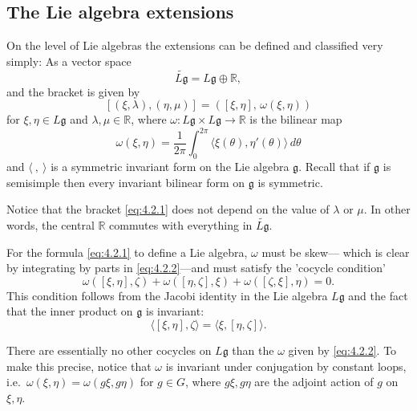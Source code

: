 \documentclass[12pt]{article}
\begin{document}
\subsection{The Lie algebra extensions}

On the level of Lie algebras the extensions can be defined and classified
very simply:  As a vector space
\[
    \widetilde{L\mathfrak{g}} = L\mathfrak{g} \oplus \mathbb{R},
\]
and the bracket is given by
\begin{equation} \label{eq:4.2.1}
    [(\xi,\lambda), (\eta,\mu)] = ([\xi,\eta], \, \omega(\xi,\eta))
\end{equation}
for $\xi,\eta \in L\mathfrak{g}$ and $\lambda,\mu \in \mathbb{R}$, where
$\omega : L\mathfrak{g} \times L\mathfrak{g} \to \mathbb{R}$ is the bilinear map
\begin{equation} \label{eq:4.2.2}
    \omega(\xi,\eta) = \frac{1}{2\pi} \int_0^{2\pi} \langle \xi(\theta), \eta'(\theta)\rangle \, d\theta
\end{equation}
and $\langle \ , \ \rangle$ is a symmetric invariant form on the Lie algebra
$\mathfrak{g}$. Recall that if $\mathfrak{g}$ is semisimple then every invariant bilinear form on $\mathfrak{g}$ is symmetric.

\begin{remark}
    Notice that the bracket \eqref{eq:4.2.1} does not depend on the value of $\lambda$ or $\mu$. In other words, the central $\mathbb{R}$ commutes with everything in $\widetilde{L\mathfrak{g}}$.
\end{remark}

For the formula \eqref{eq:4.2.1} to define a Lie algebra, $\omega$ must be skew—
which is clear by integrating by parts in \eqref{eq:4.2.2}—and must satisfy the
'cocycle condition'
\begin{equation} \label{eq:4.2.3}
    \omega([\xi,\eta],\zeta) + \omega([\eta,\zeta],\xi) + \omega([\zeta,\xi],\eta) = 0.
\end{equation}
This condition follows from the Jacobi identity in the Lie algebra
$L\mathfrak{g}$ and the fact that the inner product on $\mathfrak{g}$ is invariant:
\[
    \langle [\xi,\eta],\zeta \rangle = \langle \xi,[\eta,\zeta]\rangle.
\]

There are essentially no other cocycles on $L\mathfrak{g}$ than the $\omega$ given
by \eqref{eq:4.2.2}. To make this precise, notice that $\omega$ is invariant under
conjugation by constant loops, i.e.\ $\omega(\xi,\eta) = \omega(g\xi, g\eta)$
for $g \in G$, where $g\xi, g\eta$ are the adjoint action of $g$ on $\xi,\eta$.
\end{document}
